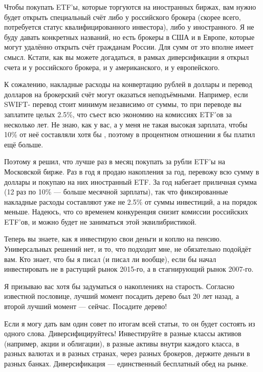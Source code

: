 Чтобы покупать ETF'ы, которые торгуются на иностранных биржах, вам нужно будет 
открыть специальный счёт либо у российского брокера (скорее всего, потребуется 
статус квалифицированного инвестора), либо у иностранного. Я не буду давать 
конкретных названий, но есть брокеры в США и в Европе, которые могут удалённо 
открыть счёт гражданам России. Для сумм от  это вполне имеет 
смысл. Кстати, как вы можете догадаться, в рамках диверсификации я открыл счета 
и у российского брокера, и у американского, и у европейского.

К сожалению, накладные расходы на конвертацию рублей в доллары и перевод 
долларов на брокерский счёт могут оказаться неподъёмными. Например, если SWIFT-
перевод стоит минимум  независимо от суммы, то при переводе 
 вы заплатите целых 2.5\%, что съест всю экономию на комиссиях 
ETF'ов за несколько лет. Не знаю, как у вас, а у меня не такая высокая зарплата, 
чтобы 10\% от неё составляли хотя бы , поэтому в процентном 
отношении я бы платил ещё больше.

Поэтому я решил, что лучше раз в месяц покупать за рубли ETF'ы на Московской 
бирже. Раз в год я продаю накопления за год, перевожу всю сумму в доллары и 
покупаю на них иностранный ETF. За год набегает приличная сумма (12 раз по 10\% 
--- больше месячной зарплаты), так что фиксированные накладные расходы 
составляют уже не 2.5\% от суммы инвестиций, а на порядок меньше. Надеюсь, что 
со временем конкуренция снизит комиссии российских ETF'ов, и можно будет не 
заниматься этой эквилибристикой.

Теперь вы знаете, как я инвестирую свои деньги и коплю на пенсию. Универсальных 
решений нет, и то, что подходит мне, не обязательно подойдёт вам. Кто знает, 
что бы я писал (и писал ли вообще), если бы начал инвестировать не в растущий 
рынок 2015-го, а в стагнирующий рынок 2007-го.

Я призываю вас хотя бы задуматься о накоплениях на старость. Согласно известной 
пословице, лучший момент посадить дерево был 20 лет назад, а второй лучший 
момент --- сейчас. Посадите дерево!

\clearpage
{}

Если я могу дать вам один совет по итогам всей статьи, то он будет состоять из 
одного слова. Диверсифицируйтесь! Инвестируйте в разные классы активов 
(например, акции и облигации), в разные активы внутри каждого класса, в разных
валютах и в разных странах, через разных брокеров, держите деньги в разных 
банках. Диверсификация --- единственный бесплатный обед на рынке.

